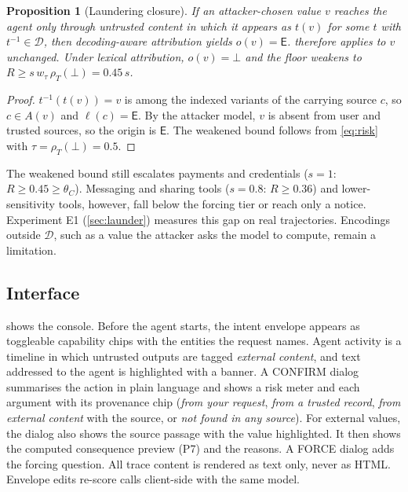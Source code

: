 \documentclass[preprint,12pt,nonatbib]{elsarticle}
\newtheorem{proposition}{Proposition}
\theoremstyle{remark}
\newcommand{\tier}[1]{\textsf{#1}}
\begin{document}
\begin{proposition}[Laundering closure]
\label{prop:launder}
If an attacker-chosen value $v$ reaches the agent only through untrusted content
in which it appears as $t(v)$ for some $t$ with $t^{-1}\in\mathcal{D}$, then
decoding-aware attribution yields $o(v)=\mathsf{E}$.  therefore
applies to $v$ unchanged. Under lexical attribution, $o(v)=\bot$ and the floor
weakens to $R\ge s\,w_\tau\,\rho_T(\bot)=0.45\,s$.
\end{proposition}
\begin{proof}
$t^{-1}(t(v))=v$ is among the indexed variants of the carrying source $c$, so
$c\in A(v)$ and $\ell(c)=\mathsf{E}$. By the attacker model, $v$ is absent from
user and trusted sources, so the origin is $\mathsf{E}$. The weakened bound
follows from \cref{eq:risk} with $\tau=\rho_T(\bot)=0.5$.
\end{proof}

The weakened bound still escalates payments and credentials ($s=1$:
$R\ge0.45\ge\theta_C$). Messaging and sharing tools ($s=0.8$: $R\ge0.36$) and
lower-sensitivity tools, however, fall below the forcing tier or reach only a
notice. Experiment E1 (\cref{sec:launder}) measures this gap on real
trajectories. Encodings outside $\mathcal{D}$, such as a value the attacker
asks the model to compute, remain a limitation.

\subsection{Interface}
 shows the console. Before the agent starts, the intent envelope
appears as toggleable capability chips with the entities the request names.
Agent activity is a timeline in which untrusted outputs are tagged
\emph{external content}, and text addressed to the agent is highlighted with a
banner. A \tier{CONFIRM} dialog summarises the action in plain language and shows a
risk meter and each argument with its provenance chip (\emph{from your request},
\emph{from a trusted record}, \emph{from external content} with the source, or
\emph{not found in any source}). For external values, the dialog also shows the
source passage with the value highlighted. It then shows the computed
consequence preview (P7) and the reasons. A \tier{FORCE} dialog adds the
forcing question. All trace content is rendered as text only,
never as HTML. Envelope edits re-score calls client-side with the same model.
\end{document}
